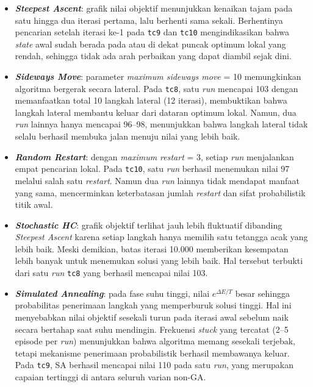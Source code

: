 \begin{itemize}
    \item \textbf{\textit{Steepest Ascent}}: grafik nilai objektif menunjukkan kenaikan tajam pada satu hingga dua iterasi pertama, lalu berhenti sama sekali. Berhentinya pencarian setelah iterasi ke-1 pada \texttt{tc9} dan \texttt{tc10} mengindikasikan bahwa \textit{state} awal sudah berada pada atau di dekat puncak optimum lokal yang rendah, sehingga tidak ada arah perbaikan yang dapat diambil sejak dini.

    \item \textbf{\textit{Sideways Move}}: parameter \textit{maximum sideways move} = 10 memungkinkan algoritma bergerak secara lateral. Pada \texttt{tc8}, satu \textit{run} mencapai 103 dengan memanfaatkan total 10 langkah lateral (12 iterasi), membuktikan bahwa langkah lateral membantu keluar dari dataran optimum lokal. Namun, dua \textit{run} lainnya hanya mencapai 96--98, menunjukkan bahwa langkah lateral tidak selalu berhasil membuka jalan menuju nilai yang lebih baik.

    \item \textbf{\textit{Random Restart}}: dengan \textit{maximum restart} = 3, setiap \textit{run} menjalankan empat pencarian lokal. Pada \texttt{tc10}, satu \textit{run} berhasil menemukan nilai 97 melalui salah satu \textit{restart}. Namun dua \textit{run} lainnya tidak mendapat manfaat yang sama, mencerminkan keterbatasan jumlah \textit{restart} dan sifat probabilistik titik awal.

    \item \textbf{\textit{Stochastic HC}}: grafik objektif terlihat jauh lebih fluktuatif dibanding \textit{Steepest Ascent} karena setiap langkah hanya memilih satu tetangga acak yang lebih baik. Meski demikian, batas iterasi 10.000 memberikan kesempatan lebih banyak untuk menemukan solusi yang lebih baik. Hal tersebut terbukti dari satu \textit{run} \texttt{tc8} yang berhasil mencapai nilai 103.

    \item \textbf{\textit{Simulated Annealing}}: pada fase suhu tinggi, nilai $e^{\Delta E/T}$ besar sehingga probabilitas penerimaan langkah yang memperburuk solusi tinggi. Hal ini menyebabkan nilai objektif sesekali turun pada iterasi awal sebelum naik secara bertahap saat suhu mendingin. Frekuensi \textit{stuck} yang tercatat (2--5 episode per \textit{run}) menunjukkan bahwa algoritma memang sesekali terjebak, tetapi mekanisme penerimaan probabilistik berhasil membawanya keluar. Pada \texttt{tc9}, SA berhasil mencapai nilai 110 pada satu \textit{run}, yang merupakan capaian tertinggi di antara seluruh varian non-GA.
\end{itemize}

